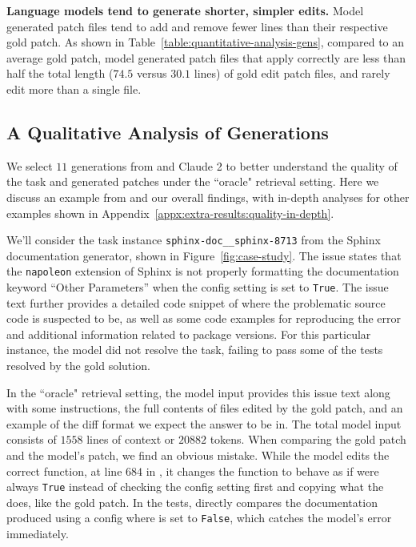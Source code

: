 \textbf{Language models tend to generate shorter, simpler edits.}
Model generated patch files tend to add and remove fewer lines than their respective gold patch.
As shown in Table~\ref{table:quantitative-analysis-gens}, compared to an average gold patch, model generated patch files that apply correctly are less than half the total length ($74.5$ versus $30.1$ lines) of gold edit patch files, and rarely edit more than a single file.



\subsection{A Qualitative Analysis of \swellama{} Generations}
\label{sec:results:quality-study}
We select $11$ generations from \swellama{} and Claude 2 to better understand the quality of the task and generated patches under the ``oracle" retrieval setting.
Here we discuss an example from \swellama{} and our overall findings, with in-depth analyses for other examples shown in Appendix~\ref{appx:extra-results:quality-in-depth}.



We'll consider the task instance \texttt{sphinx-doc\_\_sphinx-8713} from the Sphinx documentation generator, shown in Figure~\ref{fig:case-study}.
The issue states that the \texttt{napoleon} extension of Sphinx is not properly formatting the documentation keyword ``Other Parameters'' when the config setting  is set to \texttt{True}.
The issue text further provides a detailed code snippet of where the problematic source code is suspected to be, as well as some code examples for reproducing the error and additional information related to package versions.
For this particular instance, the model did not resolve the task, failing to pass some of the tests resolved by the gold solution.

In the ``oracle" retrieval setting, the model input provides this issue text along with some instructions, the full contents of files edited by the gold patch, and an example of the diff format we expect the answer to be in.
The total model input consists of $\num{1558}$ lines of context or $\num{20882}$ tokens. When comparing the gold patch and the model's patch, we find an obvious mistake.
While the model edits the correct function,  at line $684$ in , it changes the function to behave as if  were always \texttt{True} instead of checking the config setting first and copying what the  does, like the gold patch.
In the tests,  directly compares the documentation produced using a config where  is set to \texttt{False}, which catches the model's error immediately.


